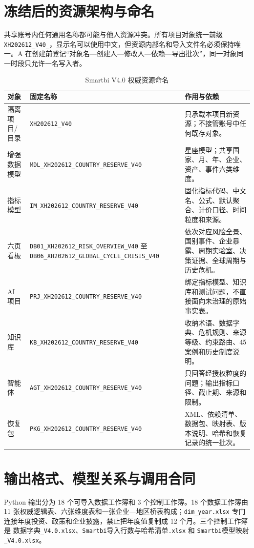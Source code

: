 \documentclass[UTF8,fontset=windows,12pt,openany]{ctexbook}
\newcommand{\Field}[1]{{\small\nolinkurl{#1}}}
\newcommand{\File}[1]{{\small\nolinkurl{#1}}}
\begin{document}
\section{冻结后的资源架构与命名}

共享账号内任何通用名称都可能与他人资源冲突。所有项目对象统一前缀 \Field{XH202612_V40_}，显示名可以使用中文，但资源内部名和导入文件名必须保持唯一。A 在创建前登记“对象名—创建人—修改人—依赖—导出批次”，同一对象同一时段只允许一名写入者。

\begin{longtable}{p{3.4cm}p{5.4cm}p{5.2cm}}
\caption{Smartbi V4.0 权威资源命名}\label{tab:smartbi-resource-names}\\
\toprule
\textbf{对象} & \textbf{固定名称} & \textbf{作用与依赖}\\
\midrule
隔离项目/目录 & \Field{XH202612_V40} & 只承载本项目新资源；不接管账号中任何既存对象。\\
增强数据模型 & \Field{MDL_XH202612_COUNTRY_RESERVE_V40} & 星座模型；共享国家、月、年、企业、资产、事件六类维度。\\
指标模型 & \Field{IM_XH202612_COUNTRY_RESERVE_V40} & 固化指标代码、中文名、公式、默认聚合、计价口径、时间粒度和来源。\\
六页看板 & \Field{DB01_XH202612_RISK_OVERVIEW_V40} 至 \Field{DB06_XH202612_GLOBAL_CYCLE_CRISIS_V40} & 依次对应风险全景、国别事件、企业暴露、周期实验室、决策证据、全球周期与历史危机。\\
AI 项目 & \Field{PRJ_XH202612_COUNTRY_RESERVE_V40} & 绑定指标模型、知识库和测试问题，不直接面向未治理的原始事实表。\\
知识库 & \Field{KB_XH202612_COUNTRY_RESERVE_V40} & 收纳术语、数据字典、危机规则、来源等级、约束路由、45 案例和历史制度说明。\\
智能体 & \Field{AGT_XH202612_COUNTRY_RESERVE_V40} & 只回答经授权粒度的问题；输出指标口径、截止期、来源和限制。\\
恢复包 & \Field{PKG_XH202612_COUNTRY_RESERVE_V40} & XML、依赖清单、数据包、映射表、版本说明、哈希和恢复记录的统一批次。\\
\bottomrule
\end{longtable}

\section{输出格式、模型关系与调用合同}

Python 输出分为 18 个可导入数据工作簿和 3 个控制工作簿。18 个数据工作簿由 11 张权威逻辑表、六张维度表和一张企业—地区桥表构成；\Field{dim_year.xlsx} 专门连接年度投资、政策和企业披露，禁止把年度值复制成 12 个月。三个控制工作簿是 \textsf{数据字典}\File{_V4.0.xlsx}、\File{Smartbi}\textsf{导入行数与哈希清单}\File{.xlsx} 和 \File{Smartbi}\textsf{模型映射}\File{_V4.0.xlsx}。
\end{document}
